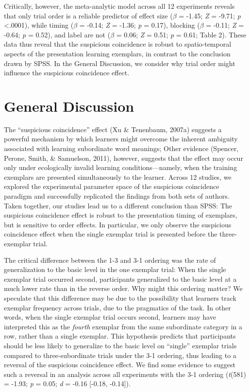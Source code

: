 \documentclass[english,floatsintext,man]{apa6}
\newcounter{author}
\theoremstyle{definition}
\theoremstyle{definition}
\theoremstyle{definition}
\theoremstyle{remark}
\begin{document}
Critically, however, the meta-analytic model across all 12 experiments
reveals that only trial order is a reliable predictor of effect size
(\(\beta\) = -1.45; \emph{Z} = -9.71; \emph{p} \textless{}.0001), while
timing (\(\beta\) = -0.14; \emph{Z} = -1.36; \emph{p} = 0.17), blocking
(\(\beta\) = -0.11; \emph{Z} = -0.64; \emph{p} = 0.52), and label are
not (\(\beta\) = 0.06; \emph{Z} = 0.51; \emph{p} = 0.61; Table 2). These
data thus reveal that the suspicious coincidence is robust to
spatio-temporal aspects of the presentation learning exemplars, in
contrast to the conclusion drawn by SPSS. In the General Discussion, we
consider why trial order might influence the suspicious coincidence
effect.

\section{General Discussion}\label{general-discussion}

The ``suspicious coincidence'' effect (Xu \& Tenenbaum, 2007a) suggests
a powerful mechanism by which learners might overcome the inherent
ambiguity associated with learning subordinate word meanings; Other
evidence (Spencer, Perone, Smith, \& Samuelson, 2011), however, suggests
that the effect may occur only under ecologically invalid learning
conditions---namely, when the training exemplars are presented
simultaneously to the learner. Across 12 studies, we explored the
experimental parameter space of the suspicious coincidence paradigm and
successfully replicated the findings from both sets of authors. Taken
together, our studies lead us to a different conclusion than SPSS: The
suspicious coincidence effect is robust to the presentation timing of
exemplars, but is sensitive to order effects. In particular, we only
observe the suspicious coincidence effect when the single exemplar trial
is presented before the three-exemplar trial.

The critical difference between the 1-3 and 3-1 ordering was the rate of
generalization to the basic level in the one exemplar trial: When the
single exemplar trial occurred second, participants generalized to the
basic level at a much lower rate than in the reverse order. Why might
this ordering matter? We speculate that this difference may be due to
the possibility that learners track exemplar frequency across trials,
due to the pragmatics of the task. In other words, when the single
exemplar trial occurs second, learners may have interpreted this as the
\emph{fourth} exemplar from the same subordinate category in a row,
rather than a single exemplar. This hypothesis predicts that
participants should be less likely to generalize to the basic level on
\enquote{single} exemplar trials compared to three-subordinate trials
under the 3-1 ordering, thus leading to a reversal of the suspicious
coincidence effect. We find some evidence to suggest such a reversal in
an analysis across all experiments with the 3-1 ordering (\emph{t}(581)
= -1.93; \emph{p} = 0.05; \emph{d} = -0.16 {[}-0.18, -0.14{]}).
\end{document}
